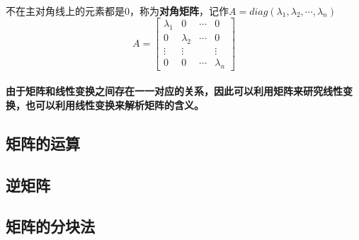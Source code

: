 \paragraph{}
不在主对角线上的元素都是$0$，称为\textbf{对角矩阵}，记作$A = diag(\lambda_1,\lambda_2,\cdots,\lambda_n)$
\begin{equation*}
  A = \left[\begin{array}{cccc}
    \lambda_1 & 0 & \cdots & 0 \\
    0 & \lambda_2 & \cdots & 0 \\
    \vdots & \vdots & & \vdots \\
    0 & 0 & \cdots & \lambda_n
  \end{array}\right]
\end{equation*}

\paragraph{}
\textbf{由于矩阵和线性变换之间存在一一对应的关系，因此可以利用矩阵来研究线性变换，也可以利用线性变换来解析矩阵的含义。}

\subsection{矩阵的运算}
\paragraph{}

\subsection{逆矩阵}
\paragraph{}

\subsection{矩阵的分块法}
\paragraph{}
